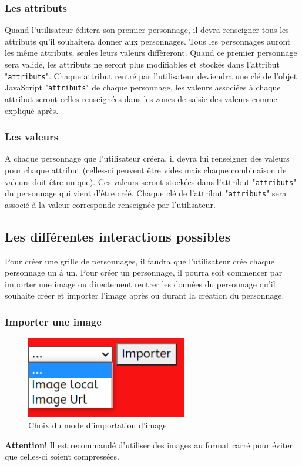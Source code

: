 \documentclass{article}
\begin{document}
            \subsubsection{Les attributs}
                Quand l'utilisateur éditera son premier personnage, il devra renseigner tous les attributs qu'il souhaitera donner aux personnages. Tous les personnages auront les même attributs, seules leurs valeurs diffèreront.
                Quand ce premier personnage sera validé, les attributs ne seront plus modifiables et stockés dans l'attribut "\texttt{attributs}". Chaque attribut rentré par l'utilisateur deviendra une clé de l'objet JavaScript "\texttt{attributs}" de chaque personnage, les valeurs associées à chaque attribut seront celles renseignées dans les zones de saisie des valeurs comme expliqué après.
            
            \subsubsection{Les valeurs}
                A chaque personnage que l'utilisateur créera, il devra lui renseigner des valeurs pour chaque attribut (celles-ci peuvent être vides mais chaque combinaison de valeurs doit être unique). Ces valeurs seront stockées dans l'attribut "\texttt{attributs}" du personnage qui vient d'être créé. Chaque clé de l'attribut "\texttt{attributs}" sera associé à la valeur corresponde renseignée par l'utilisateur.
        
        \subsection{Les différentes interactions possibles}
            Pour créer une grille de personnages, il faudra que l'utilisateur crée chaque personnage un à un. Pour créer un personnage, il pourra soit commencer par importer une image ou directement rentrer les données du personnage qu'il souhaite créer et importer l'image après ou durant la création du personnage.\\
            
            \subsubsection{Importer une image}
            \begin{figure}[h]
                \centering \includegraphics[width=7cm]{images/importer.png}
                \caption{Choix du mode d'importation d'image}
            \end{figure}
            {\large \textbf{Attention}!} Il est recommandé d'utiliser des images au format carré pour éviter que celles-ci soient compressées.\\
            
\end{document}
